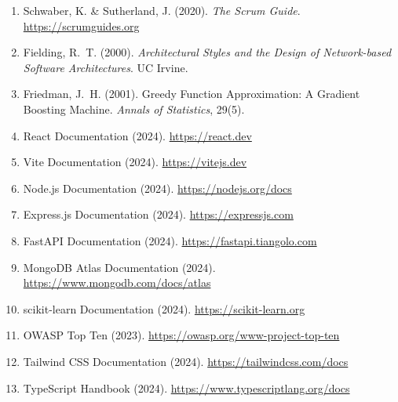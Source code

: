 \documentclass[12pt,a4paper]{report}
\begin{document}
\begin{enumerate}[noitemsep]
  \item Schwaber, K. \& Sutherland, J. (2020). \textit{The Scrum Guide}. \url{https://scrumguides.org}
  \item Fielding, R.~T. (2000). \textit{Architectural Styles and the Design of Network-based Software Architectures}. UC Irvine.
  \item Friedman, J.~H. (2001). Greedy Function Approximation: A Gradient Boosting Machine. \textit{Annals of Statistics}, 29(5).
  \item React Documentation (2024). \url{https://react.dev}
  \item Vite Documentation (2024). \url{https://vitejs.dev}
  \item Node.js Documentation (2024). \url{https://nodejs.org/docs}
  \item Express.js Documentation (2024). \url{https://expressjs.com}
  \item FastAPI Documentation (2024). \url{https://fastapi.tiangolo.com}
  \item MongoDB Atlas Documentation (2024). \url{https://www.mongodb.com/docs/atlas}
  \item scikit-learn Documentation (2024). \url{https://scikit-learn.org}
  \item OWASP Top Ten (2023). \url{https://owasp.org/www-project-top-ten}
  \item Tailwind CSS Documentation (2024). \url{https://tailwindcss.com/docs}
  \item TypeScript Handbook (2024). \url{https://www.typescriptlang.org/docs}
\end{enumerate}
\end{document}
